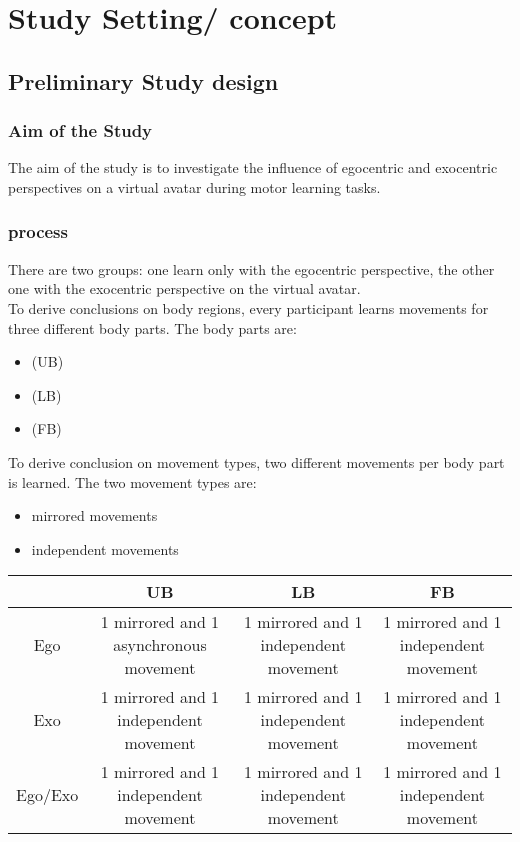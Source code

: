 \chapter{Study Setting/ concept}

\section{Preliminary Study design}
\subsection{Aim of the Study}
The aim of the study is to investigate the influence of egocentric and exocentric perspectives on a virtual avatar during motor learning tasks.

\subsection{process}
There are two groups: one learn only with the egocentric perspective, the other one with the exocentric perspective on the virtual avatar.\\
To derive conclusions on body regions, every participant learns movements for three different body parts. The body parts are:
\begin{itemize}
	\item \UB (UB)
	\item \LB (LB)
	\item \FB (FB)
\end{itemize}
To derive conclusion on movement types, two different movements per body part is learned. The two movement types are:
\begin{itemize}
	\item mirrored movements
	\item independent movements
\end{itemize}

\begin{center}
	\begin{tabular}{ | c | c | c | c | }
		\hline
		 & UB & LB & FB \\ \hline 
		Ego & \parbox{4cm}{1 mirrored and 1 asynchronous movement} & \parbox{4cm}{1 mirrored and 1 independent movement} & \parbox{4cm}{1 mirrored and 1 independent movement} \\ \hline 
		Exo & \parbox{4cm}{1 mirrored and 1 independent movement} & \parbox{4cm}{1 mirrored and 1 independent movement} & \parbox{4cm}{1 mirrored and 1 independent movement} \\ \hline
		Ego/Exo & \parbox{4cm}{1 mirrored and 1 independent movement} & \parbox{4cm}{1 mirrored and 1 independent movement} & \parbox{4cm}{1 mirrored and 1 independent movement} \\
		\hline
	\end{tabular}
\end{center}


